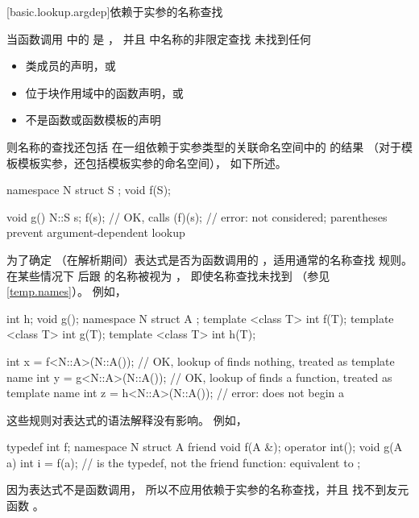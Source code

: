 [basic.lookup.argdep]{依赖于实参的名称查找}%

\pnum
当函数调用 中的  是 ，
并且  中名称的非限定查找 未找到任何
\begin{itemize}
\item
类成员的声明，或
\item
位于块作用域中的函数声明，或
\item
不是函数或函数模板的声明
\end{itemize}
则名称的查找还包括
在一组依赖于实参类型的关联命名空间中的
 的结果
（对于模板模板实参，还包括模板实参的命名空间），
如下所述。
\begin{example}
\begin{codeblock}
namespace N {
  struct S { };
  void f(S);
}

void g() {
  N::S s;
  f(s);             // OK, calls 
  (f)(s);           // error:  not considered; parentheses prevent argument-dependent lookup
}
\end{codeblock}
\end{example}

\pnum
\begin{note}
为了确定
（在解析期间）表达式是否为函数调用的
，适用通常的名称查找
规则。
在某些情况下
后跟 \tcode{<} 的名称被视为 ，
即使名称查找未找到 
（参见 \ref{temp.names}）。
例如，
\begin{codeblock}
int h;
void g();
namespace N {
  struct A {};
  template <class T> int f(T);
  template <class T> int g(T);
  template <class T> int h(T);
}

int x = f<N::A>(N::A());        // OK, lookup of  finds nothing,  treated as template name
int y = g<N::A>(N::A());        // OK, lookup of  finds a function,  treated as template name
int z = h<N::A>(N::A());        // error:  does not begin a 
\end{codeblock}

这些规则对表达式的语法解释没有影响。
例如，
\begin{codeblock}
typedef int f;
namespace N {
  struct A {
    friend void f(A &);
    operator int();
    void g(A a) {
      int i = f(a);             //  is the typedef, not the friend function: equivalent to 
    }
  };
}
\end{codeblock}
因为表达式不是函数调用，
所以不应用依赖于实参的名称查找，并且
找不到友元函数 。
\end{note}

